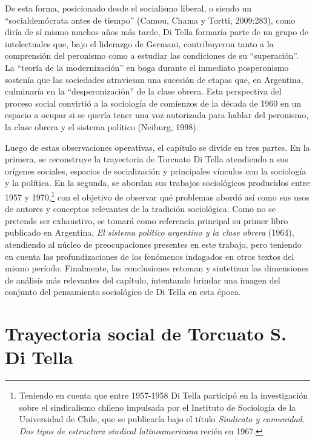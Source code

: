 De esta forma, posicionado desde el socialismo liberal, o siendo un ``socialdemócrata antes de tiempo'' (Camou, Chama y Tortti, 2009:283), como diría de sí mismo muchos años más tarde, Di Tella formaría parte de un grupo de intelectuales que, bajo el liderazgo de Germani, contribuyeron tanto a la comprensión del peronismo como a estudiar las condiciones de su ``superación''. La ``teoría de la modernización'' en boga durante el inmediato posperonismo sostenía que las sociedades atraviesan una sucesión de etapas que, en Argentina, culminaría en la ``desperonización'' de la clase obrera. Esta perspectiva del proceso social convirtió a la sociología de comienzos de la década de 1960 en un espacio a ocupar si se quería tener una voz autorizada para hablar del peronismo, la clase obrera y el sistema político (Neiburg, 1998).

Luego de estas observaciones operativas, el capítulo se divide en tres partes. En la primera, se reconstruye la trayectoria de Torcuato Di Tella atendiendo a sus orígenes sociales, espacios de socialización y principales vínculos con la sociología y la política. En la segunda, se abordan sus trabajos sociológicos producidos entre 1957 y 1970,\footnote{Teniendo en cuenta que entre 1957-1958 Di Tella participó en la investigación sobre el sindicalismo chileno impulsada por el Instituto de Sociología de la Universidad de Chile, que se publicaría bajo el título \emph{Sindicato y comunidad. Dos tipos de estructura sindical latinoamericana} recién en 1967.} con el objetivo de observar qué problemas abordó así como sus usos de autores y conceptos relevantes de la tradición sociológica. Como no se pretende ser exhaustivo, se tomará como referencia principal su primer libro publicado en Argentina, \emph{El sistema político argentino y la clase obrera} (1964), atendiendo al núcleo de preocupaciones presentes en este trabajo, pero teniendo en cuenta las profundizaciones de los fenómenos indagados en otros textos del mismo período. Finalmente, las conclusiones retoman y sintetizan las dimensiones de análisis más relevantes del capítulo, intentando brindar una imagen del conjunto del pensamiento sociológico de Di Tella en esta época.

\section{Trayectoria social de Torcuato S. Di Tella}


